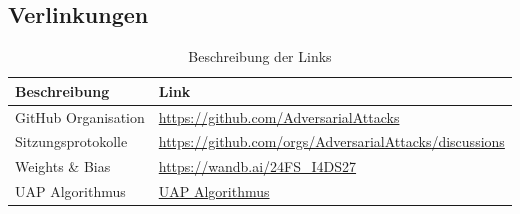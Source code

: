 \subsection*{Verlinkungen}
\begin{table}[h!]
    \centering
        \begin{tabular}{|l|l|}
        \hline
        \textbf{Beschreibung} & \textbf{Link} \\ \hline
        GitHub Organisation & \href{https://github.com/AdversarialAttacks}{https://github.com/AdversarialAttacks} \\ \hline
        Sitzungsprotokolle & \href{https://github.com/orgs/AdversarialAttacks/discussions/categories/protokolle}{https://github.com/orgs/AdversarialAttacks/discussions} \\ \hline
        Weights \& Bias & \href{https://wandb.ai/24FS_I4DS27}{https://wandb.ai/24FS\_I4DS27} \\ \hline
        UAP Algorithmus & \href{https://github.com/AdversarialAttacks/report/blob/main/01-images/05-UAP_ALG.png}{UAP Algorithmus} \\ \hline
        \end{tabular}
    \caption{Beschreibung der Links}
    \label{table-appendix:weitere-links}
\end{table}
